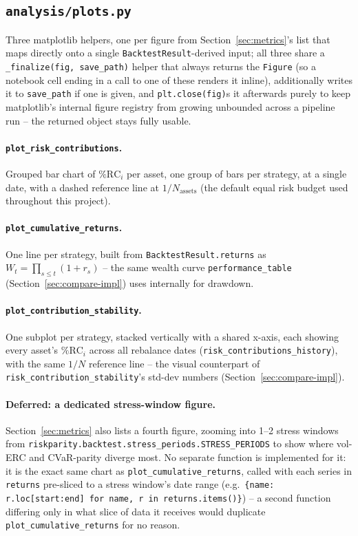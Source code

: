 \documentclass[11pt]{article}
\begin{document}
\subsection{\texttt{analysis/plots.py}}
\label{sec:plots-impl}

Three matplotlib helpers, one per figure from Section~\ref{sec:metrics}'s
list that maps directly onto a single \texttt{BacktestResult}-derived
input; all three share a \texttt{\_finalize(fig, save\_path)} helper
that always returns the \texttt{Figure} (so a notebook cell ending in a
call to one of these renders it inline), additionally writes it to
\texttt{save\_path} if one is given, and \texttt{plt.close(fig)}s it
afterwards purely to keep matplotlib's internal figure registry from
growing unbounded across a pipeline run -- the returned object stays
fully usable.

\paragraph{\texttt{plot\_risk\_contributions}.} Grouped bar chart of
$\%\text{RC}_i$ per asset, one group of bars per strategy, at a single
date, with a dashed reference line at $1/N_{\text{assets}}$ (the
default equal risk budget used throughout this project).

\paragraph{\texttt{plot\_cumulative\_returns}.} One line per strategy,
built from \texttt{BacktestResult.returns} as $W_t =
\prod_{s\leq t}(1+r_s)$ -- the same wealth curve
\texttt{performance\_table} (Section~\ref{sec:compare-impl}) uses
internally for drawdown.

\paragraph{\texttt{plot\_contribution\_stability}.} One subplot per
strategy, stacked vertically with a shared x-axis, each showing every
asset's $\%\text{RC}_i$ across all rebalance dates
(\texttt{risk\_contributions\_history}), with the same $1/N$ reference
line -- the visual counterpart of
\texttt{risk\_contribution\_stability}'s std-dev numbers
(Section~\ref{sec:compare-impl}).

\paragraph{Deferred: a dedicated stress-window figure.} Section~\ref{sec:metrics}
also lists a fourth figure, zooming into 1--2 stress windows from
\texttt{riskparity.backtest.stress\_periods.STRESS\_PERIODS} to show
where vol-ERC and CVaR-parity diverge most. No separate function is
implemented for it: it is the exact same chart as
\texttt{plot\_cumulative\_returns}, called with each series in
\texttt{returns} pre-sliced to a stress window's date range (e.g.\
\texttt{\{name: r.loc[start:end] for name, r in returns.items()\}}) --
a second function differing only in what slice of data it receives
would duplicate \texttt{plot\_cumulative\_returns} for no reason.
\end{document}

